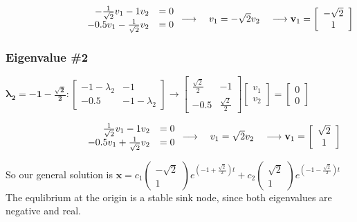 \documentclass[12pt]{article}
\begin{document}
\begin{enumerate}
    $\hspace*{2.8cm}\begin{array}{rr} -\frac{1}{\sqrt{2}}v_1 - 1v_2 &=0 \\ -0.5v_1 - \frac{1}{\sqrt{2}}v_2 &=0 \end{array} 
     \longrightarrow \quad v_1=-\sqrt{2}v_2 \quad \longrightarrow \mathbf{v}_1 =\left[\begin{array}{cc} -\sqrt{2} \\ 1 \end{array}\right]$

    \subsubsection*{Eigenvalue \#2}
    $\mathbf{\lambda_2 = -1 - \frac{\sqrt{2}}{2}}: 
    \left[\begin{array}{cc} -1 - \lambda_2 & -1\\ -0.5 & -1 - \lambda_2\end{array}\right]
    \rightarrow \left[\begin{array}{rr} \frac{\sqrt{2}}{2} & -1\\ -0.5 & \frac{\sqrt{2}}{2} \end{array}\right] \left[\begin{array}{cc} v_1 \\ v_2 \end{array}\right] = \left[\begin{array}{cc} 0 \\ 0 \end{array}\right]$

    $\hspace*{2.8cm}\begin{array}{rr} \frac{1}{\sqrt{2}}v_1 - 1v_2 &=0 \\ -0.5v_1 + \frac{1}{\sqrt{2}}v_2 &=0 \end{array} 
     \longrightarrow \quad v_1=\sqrt{2}v_2 \quad \longrightarrow \mathbf{v}_1 =\left[\begin{array}{cc} \sqrt{2} \\ 1 \end{array}\right]$

    So our general solution is $\mathbf{x} = c_1\begin{pmatrix} -\sqrt{2} \\ 1 \end{pmatrix}e^{(-1 + \frac{\sqrt{2}}{2})t} + c_2\begin{pmatrix} \sqrt{2} \\ 1 \end{pmatrix}e^{(-1 - \frac{\sqrt{2}}{2})t}$ \\
    The equlibrium at the origin is a stable sink node, since both eigenvalues are negative and real. \\
    

\end{enumerate}
\end{document}
